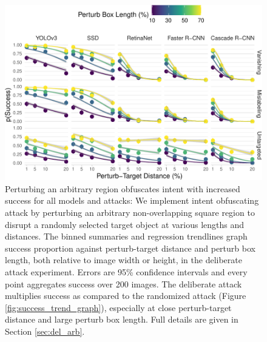 \documentclass[
]{article}
\begin{document}
\begin{figure}[tb]

{\centering \includegraphics[width=1\linewidth]{imgs/arbitrary_trend_graph-1} 

}

\caption{Perturbing an arbitrary region obfuscates intent with increased success for all models and attacks:  We implement intent obfuscating attack by perturbing an arbitrary non-overlapping square region to disrupt a randomly selected target object at various lengths and distances. The binned summaries and regression trendlines graph success proportion against perturb-target distance and perturb box length, both relative to image width or height, in the deliberate attack experiment. Errors are 95\% confidence intervals and every point aggregates success over 200 images. The deliberate attack multiplies success as compared to the randomized attack (Figure \ref{fig:success_trend_graph}), especially at close perturb-target distance and large perturb box length. Full details are given in Section \ref{sec:del_arb}.}\label{fig:arbitrary_trend_graph}
\end{figure}

\begingroup\fontsize{9}{11}\selectfont
\end{document}
